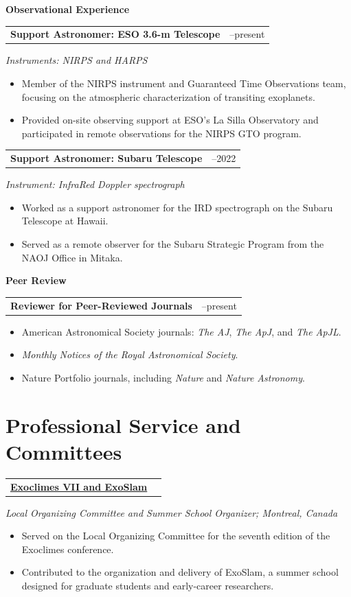 \documentclass[10pt,a4paper]{article}
\makeatletter
\newcommand{\grantheading}[2]{%
\begin{tabularx}{\textwidth}{
    @{}
    >{\raggedright\arraybackslash}X
    >{\raggedleft\arraybackslash}p{4.5cm}
    @{}
}
\textbf{#1} & #2
\end{tabularx}
}
\newenvironment{lightitems}
{%
  \begin{itemize}[
      label=\textcolor{entrylight}{\textbullet},
      leftmargin=1.3em,
      itemsep=1pt,
      topsep=2pt,
      parsep=0pt
  ]
  \color{entrylight}
}
{%
  \end{itemize}
}
\makeatother
\begin{document}
\textbf{\color{navy}Observational Experience}

\grantheading
{Support Astronomer: ESO 3.6-m Telescope}
{2022--present}
\emph{Instruments: NIRPS and HARPS}
\begin{lightitems}
\item
\vspace{-1.5mm}Member of the NIRPS instrument and Guaranteed Time Observations team,
focusing on the atmospheric characterization of transiting exoplanets.
\item
Provided on-site observing support at ESO's La Silla Observatory and
participated in remote observations for the NIRPS GTO program.
\end{lightitems}


\grantheading
{Support Astronomer: Subaru Telescope}
{2020--2022}
\emph{Instrument: InfraRed Doppler spectrograph}
\begin{lightitems}
\item
\vspace{-1.5mm}Worked as a support astronomer for the IRD spectrograph on the Subaru Telescope at Hawaii.
\item
Served as a remote observer for the Subaru Strategic Program from the NAOJ Office in Mitaka.
\end{lightitems}


\textbf{\color{navy}Peer Review}

\grantheading
{Reviewer for Peer-Reviewed Journals}
{2021--present}
\begin{lightitems}
\item
\vspace{-1.5mm}American Astronomical Society journals:
\emph{The AJ},
\emph{The ApJ}, and
\emph{The ApJL}.
\item
\emph{Monthly Notices of the Royal Astronomical Society}.
\item
Nature Portfolio journals, including
\emph{Nature} and \emph{Nature Astronomy}.
\end{lightitems}

\section{Professional Service and Committees}

\grantheading
{\href{https://exoclimes.org/}{Exoclimes VII and ExoSlam}}
{2025}
\emph{Local Organizing Committee and Summer School Organizer;
Montreal, Canada}
\begin{lightitems}
\item
\vspace{-1.5mm}Served on the Local Organizing Committee for the seventh edition of
the Exoclimes conference.
\item
Contributed to the organization and delivery of ExoSlam, a summer
school designed for graduate students and early-career researchers.
\end{lightitems}
\end{document}
